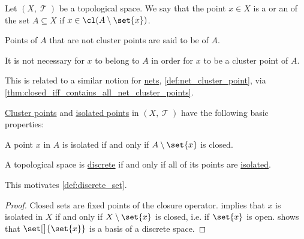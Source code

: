 \begin{definition}\label{def:set_cluster_point}
  Let \( (X, \mscrT) \) be a topological space. We say that the point \( x \in X \) is a  or an  of the set \( A \subseteq X \) if \( x \in \cl(A \setminus \set{ x }) \).

  Points of \( A \) that are not cluster points are said to be  of \( A \).

\end{definition}
\begin{comments}
  \item It is not necessary for \( x \) to belong to \( A \) in order for \( x \) to be a cluster point of \( A \).
  \item This is related to a similar notion for \hyperref[def:topological_net]{nets}, \cref{def:net_cluster_point}, via \cref{thm:closed_iff_contains_all_net_cluster_points}.
\end{comments}

\begin{proposition}\label{thm:def:set_cluster_point}
  \hyperref[def:set_cluster_point]{Cluster points} and \hyperref[def:set_cluster_point]{isolated points} in \( (X, \mscrT) \) have the following basic properties:
  \begin{thmenum}
     A point \( x \) in \( A \) is isolated if and only if \( A \setminus \set{ x } \) is closed.

     A topological space is \hyperref[def:discrete_topology]{discrete} if and only if all of its points are \hyperref[def:set_cluster_point]{isolated}.

    This motivates \cref{def:discrete_set}.
  \end{thmenum}
\end{proposition}
\begin{proof}
   Closed sets are fixed points of the closure operator.
    implies that \( x \) is isolated in \( X \) if and only if \( X \setminus \set{ x } \) is closed, i.e. if \( \set{ x } \) is open.  shows that \( \set[\big]{ \set{ x } } \) is a basis of a discrete space.
\end{proof}


